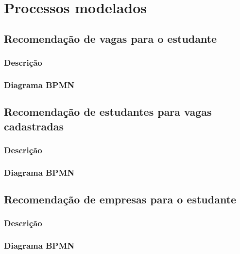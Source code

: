 \chapter{Processos modelados}

\section{Recomendação de vagas para o estudante}
\subsection{Descrição}

\subsection{Diagrama BPMN}


\section{Recomendação de estudantes para vagas cadastradas}
\subsection{Descrição}

\subsection{Diagrama BPMN}


\section{Recomendação de empresas para o estudante}
\subsection{Descrição}

\subsection{Diagrama BPMN}

